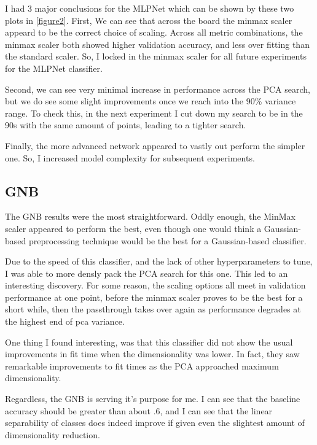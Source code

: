 \documentclass[12pt]{article}
\begin{document}
I had 3 major conclusions for the MLPNet which can be shown by these two plots in \ref{figure2}. First, We can see 
that across the board the minmax scaler appeard to be the correct choice of scaling. Across all metric combinations,
the minmax scaler both showed higher validation accuracy, and less over fitting than the standard scaler. So, 
I locked in the minmax scaler for all future experiments for the MLPNet classifier.

Second, we can see very minimal increase in performance across the PCA search, but we do see some slight improvements 
once we reach into the 90\% variance range. To check this, in the next experiment I cut down my search to be in the 90s
with the same amount of points, leading to a tighter search.

Finally, the more advanced network appeared to vastly out perform the simpler one. So, I increased model complexity for 
subsequent experiments.

\subsection{GNB}
The GNB results were the most straightforward. Oddly enough, the MinMax scaler appeared to perform the best, even though 
one would think a Gaussian-based preprocessing technique would be the best for a Gaussian-based classifier.

Due to the speed of this classifier, and the lack of other hyperparameters to tune, I was able to more densly pack the 
PCA search for this one. This led to an interesting discovery. For some reason, the scaling options all meet in 
validation performance at one point, before the minmax scaler proves to be the best for a short while, then the 
passthrough takes over again as performance degrades at the highest end of pca variance.

One thing I found interesting, was that this classifier did not show the usual improvements in fit time when the dimensionality
was lower. In fact, they saw remarkable improvements to fit times as the PCA approached maximum dimensionality.

Regardless, the GNB is serving it's purpose for me. I can see that the baseline accuracy should be greater than about .6,
and I can see that the linear separability of classes does indeed improve if given even the slightest amount of dimensionality
reduction. 
\end{document}
